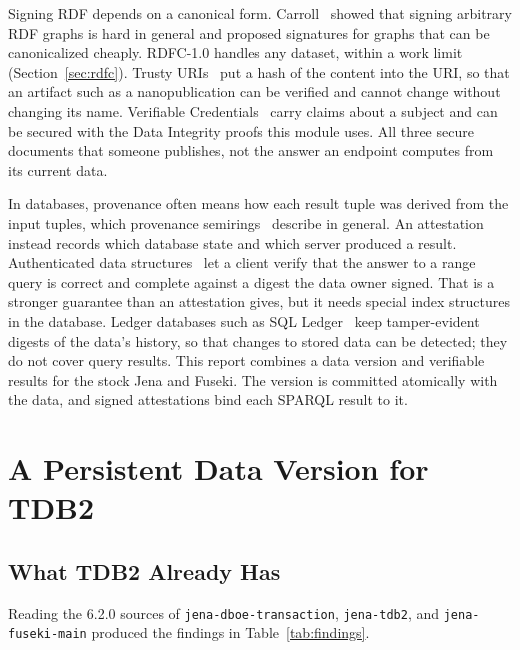\documentclass[11pt,a4paper]{article}
\newcommand{\code}[1]{\texttt{#1}}
\begin{document}
Signing RDF depends on a canonical form. Carroll~\cite{carroll2003} showed that signing
arbitrary RDF graphs is hard in general and proposed signatures for graphs that can be
canonicalized cheaply. RDFC-1.0 handles any dataset, within a work limit
(Section~\ref{sec:rdfc}). Trusty URIs~\cite{trustyuri} put a hash of the content into the URI,
so that an artifact such as a nanopublication can be verified and cannot change without
changing its name. Verifiable Credentials~\cite{vcdm2} carry claims about a subject and can be
secured with the Data Integrity proofs this module uses. All three secure documents that
someone publishes, not the answer an endpoint computes from its current data.

In databases, provenance often means how each result tuple was derived from the input tuples,
which provenance semirings~\cite{green2007} describe in general. An attestation instead records
which database state and which server produced a result. Authenticated data
structures~\cite{li2006} let a client verify that the answer to a range query is correct and
complete against a digest the data owner signed. That is a stronger guarantee than an
attestation gives, but it needs special index structures in the database. Ledger databases
such as SQL Ledger~\cite{sqlledger} keep tamper-evident digests of the data's history, so that
changes to stored data can be detected; they do not cover query results. This report combines
a data version and verifiable results for the stock Jena and Fuseki. The version is committed
atomically with the data, and signed attestations bind each SPARQL result to it.

\section{A Persistent Data Version for TDB2}
\label{sec:version}

\subsection{What TDB2 Already Has}
\label{sec:tdb-has}

Reading the 6.2.0 sources of \code{jena-dboe-transaction}, \code{jena-tdb2}, and
\code{jena-fuseki-main} produced the findings in Table~\ref{tab:findings}.
\end{document}
